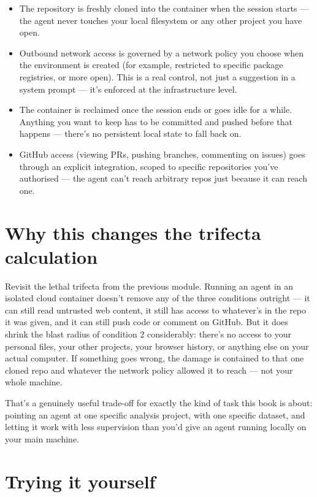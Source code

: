 \documentclass[
  letterpaper,
  DIV=11,
  numbers=noendperiod]{scrreprt}
\providecommand{\tightlist}{%
  \setlength{\itemsep}{0pt}\setlength{\parskip}{0pt}}
\begin{document}
\begin{itemize}
\tightlist
\item
  The repository is freshly cloned into the container when the session
  starts --- the agent never touches your local filesystem or any other
  project you have open.
\item
  Outbound network access is governed by a network policy you choose
  when the environment is created (for example, restricted to specific
  package registries, or more open). This is a real control, not just a
  suggestion in a system prompt --- it's enforced at the infrastructure
  level.
\item
  The container is reclaimed once the session ends or goes idle for a
  while. Anything you want to keep has to be committed and pushed before
  that happens --- there's no persistent local state to fall back on.
\item
  GitHub access (viewing PRs, pushing branches, commenting on issues)
  goes through an explicit integration, scoped to specific repositories
  you've authorised --- the agent can't reach arbitrary repos just
  because it can reach one.
\end{itemize}

\section{Why this changes the trifecta
calculation}\label{why-this-changes-the-trifecta-calculation}

Revisit the lethal trifecta from the previous module. Running an agent
in an isolated cloud container doesn't remove any of the three
conditions outright --- it can still read untrusted web content, it
still has access to whatever's in the repo it was given, and it can
still push code or comment on GitHub. But it does shrink the blast
radius of condition 2 considerably: there's no access to your personal
files, your other projects, your browser history, or anything else on
your actual computer. If something goes wrong, the damage is contained
to that one cloned repo and whatever the network policy allowed it to
reach --- not your whole machine.

That's a genuinely useful trade-off for exactly the kind of task this
book is about: pointing an agent at one specific analysis project, with
one specific dataset, and letting it work with less supervision than
you'd give an agent running locally on your main machine.

\section{Trying it yourself}\label{trying-it-yourself}
\end{document}
